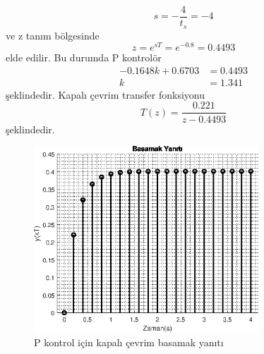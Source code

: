 \begin{equation}
    s=-\frac{4}{t_s}=-4
\end{equation}
ve z tanım bölgesinde
\begin{equation}
    z=e^{sT}=e^{-0.8}=0.4493
\end{equation}
elde edilir. Bu durumda P kontrolör
\begin{equation}
\begin{split}
    -0.1648k+0.6703&=0.4493\\
    k&=1.341
\end{split}
\end{equation}
şeklindedir. Kapalı çevrim transfer fonksiyonu
\begin{equation}
    T(z)=\frac{0.221}{z - 0.4493}
\end{equation}
şeklindedir.
\begin{figure}[!htb]
    \centering
    \includegraphics[width=0.75\textwidth]{img/lec7_step1}
    \caption{P kontrol için kapalı çevrim basamak yanıtı}
    \label{fig:lec7_step1}
\end{figure}

